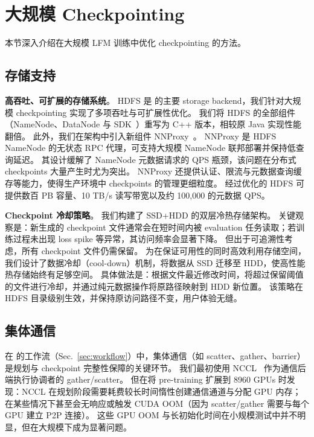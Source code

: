 \section{大规模 Checkpointing}
\label{sec:industrial_scale}
本节深入介绍在大规模 LFM 训练中优化 checkpointing 的方法。

\subsection{存储支持}\label{sec:scale_storage}

\noindent \textbf{高吞吐、可扩展的存储系统}。
HDFS 是 \sys{} 的主要 storage backend，我们针对大规模 checkpointing 实现了多项吞吐与可扩展性优化。
我们将 HDFS 的全部组件（NameNode、DataNode 与 SDK~\cite{hdfs}）重写为 C++ 版本，相较原 Java 实现性能翻倍。
此外，我们在架构中引入新组件 NNProxy~\cite{nnproxy}。
NNProxy 是 HDFS NameNode 的无状态 RPC 代理，可支持大规模 NameNode 联邦部署并保持低查询延迟。
其设计缓解了 NameNode 元数据请求的 QPS 瓶颈，该问题在分布式 checkpoints 大量产生时尤为突出。
NNProxy 还提供认证、限流与元数据查询缓存等能力，使得生产环境中 checkpoints 的管理更细粒度。
经过优化的 HDFS 可提供数百 PB 容量、10 TB/s 读写带宽以及约 100,000 的元数据 QPS。

\noindent \textbf{Checkpoint 冷却策略}。
我们构建了 SSD+HDD 的双层冷热存储架构。
关键观察是：新生成的 checkpoint 文件通常会在短时间内被 evaluation 任务读取；若训练过程未出现 loss spike 等异常，其访问频率会显著下降。
但出于可追溯性考虑，所有 checkpoint 文件仍需保留。
为在保证可用性的同时高效利用存储空间，我们设计了数据冷却（cool-down）机制，将数据从 SSD 迁移至 HDD，使高性能热存储始终有足够空间。
具体做法是：根据文件最近修改时间，将超过保留阈值的文件进行冷却，并通过纯元数据操作将原路径映射到 HDD 新位置。
该策略在 HDFS 目录级别生效，并保持原访问路径不变，用户体验无缝。

\subsection{集体通信}
\label{sec:opt_cc}

在 \sys{} 的工作流（Sec.~\ref{sec:workflow}）中，集体通信（如 scatter、gather、barrier）是规划与 checkpoint 完整性保障的关键环节。
我们最初使用 NCCL~\cite{nccl} 作为通信后端执行协调者的 gather/scatter。
但在将 pre-training 扩展到 8960 GPUs 时发现：NCCL 在规划阶段需要耗费较长时间惰性创建通信通道与分配 GPU 内存；在某些情况下甚至会无响应或触发 CUDA OOM（因为 scatter/gather 需要与每个 GPU 建立 P2P 连接）。
这些 GPU OOM 与长初始化时间在小规模测试中并不明显，但在大规模下成为显著问题。

